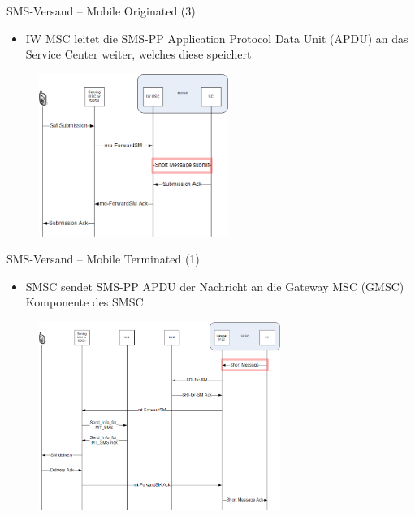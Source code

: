 \documentclass{beamer}
\begin{document}
\begin{frame}{SMS-Versand -- Mobile Originated (3)}

	\begin{itemize}
		\item IW MSC leitet die SMS-PP Application Protocol Data Unit (APDU) an das Service Center weiter, welches 
			diese speichert
	\end{itemize}
	\begin{figure}[htm]
		\includegraphics[width=0.55\textwidth]{img/mo-forward-sm-3.png}
	\end{figure}	
\end{frame}

\begin{frame}{SMS-Versand -- Mobile Terminated (1)}

	\begin{itemize}
		\item SMSC sendet SMS-PP APDU der Nachricht an die Gateway MSC (GMSC) 
			Komponente des SMSC
	\end{itemize}
	\begin{figure}[htm]
		\includegraphics[width=0.7\textwidth]{img/mt-forward-sm-1.png}
	\end{figure}
\end{frame}
\end{document}
